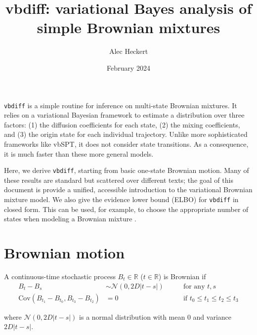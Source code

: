 \documentclass{article}
\begin{document}
\title{vbdiff: variational Bayes analysis of simple Brownian mixtures}
\date{February 2024}
\author{Alec Heckert}
\maketitle

\verb|vbdiff| is a simple routine for inference on multi-state Brownian
mixtures. It relies on a variational Bayesian framework to estimate a distribution
over three factors: (1) the diffusion coefficients for each state, (2) the mixing
coefficients, and (3) the origin state for each individual trajectory.
Unlike more sophisticated frameworks like vbSPT, it does not consider state transitions.
As a consequence, it is much faster than these more general models. \newline

Here, we derive \verb|vbdiff|, starting from basic one-state Brownian motion. Many of these results are standard but scattered over different texts; the goal
of this document is provide a unified, accessible introduction to the variational
Brownian mixture model. We also give the evidence lower bound (ELBO) for
\verb|vbdiff| in closed form. This can be used, for example, to choose the
appropriate number of states when modeling a Brownian mixture \cite{bishop2001}.

\tableofcontents

\section{Brownian motion}

A continuous-time stochastic process $B_{t} \in \mathbb{R}$ ($t \in \mathbb{R}$) is Brownian if
\begin{align}
    B_{t} - B_{s} &\sim \mathcal{N} \left( 0, 2 D \left| t - s \right| \right) \qquad &\text{for any $t, s$} \label{eq:rule1} \\
    \text{Cov} \left( B_{t_{1}} - B_{t_{0}}, B_{t_{3}} - B_{t_{2}} \right) &= 0 \qquad &\text{if $t_{0} \leq t_{1} \leq t_{2} \leq t_{3}$} \label{eq:rule2}
\end{align}

where $\mathcal{N} \left( 0, 2 D \left| t - s \right| \right)$ is a normal distribution
with mean 0 and variance $2 D \left| t - s \right|$. \newline
\end{document}
